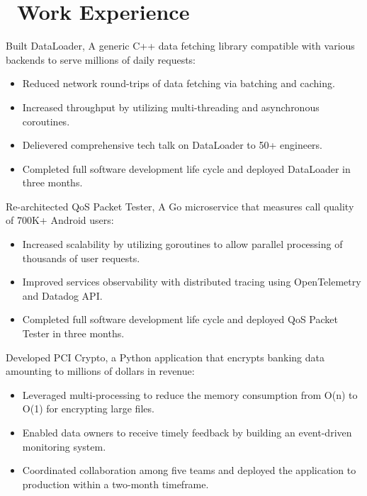 \documentclass{resume}
\begin{document}
\section{\faUsers\ Work Experience}
Built DataLoader, A generic C++ data fetching library compatible with various backends to serve millions of daily requests:
\begin{itemize}
  \item {Reduced network round-trips of data fetching via batching and caching.}
  \item {Increased throughput by utilizing multi-threading and asynchronous coroutines.}
  \item {Delievered comprehensive tech talk on DataLoader to 50+ engineers.}
  \item {Completed full software development life cycle and deployed DataLoader in three months.}
\end{itemize}

Re-architected QoS Packet Tester, A Go microservice that measures call quality of 700K+ Android users:
\begin{itemize}
  \item {Increased scalability by utilizing goroutines to allow parallel processing of thousands of user requests.}
  \item {Improved services observability with distributed tracing using OpenTelemetry and Datadog API.}
  \item {Completed full software development life cycle and deployed QoS Packet Tester in three months.}
\end{itemize}

Developed PCI Crypto, a Python application that encrypts banking data amounting to millions of dollars in revenue:
\begin{itemize}
  \item {Leveraged multi-processing to reduce the memory consumption from O(n) to O(1) for encrypting large files.}
  \item {Enabled data owners to receive timely feedback by building an event-driven monitoring system.}
  \item {Coordinated collaboration among five teams and deployed the application to production within a two-month timeframe.}
\end{itemize}
\end{document}
